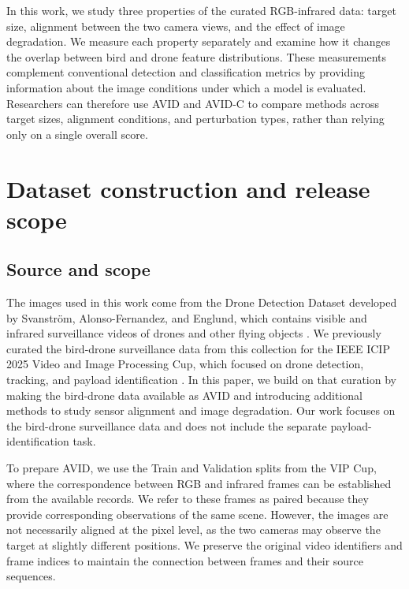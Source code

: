 \documentclass[10pt]{article}
\newcommand{\dataset}{\textsc{AVID}}
\newcommand{\corrupt}{\textsc{AVID-C}}
\begin{document}
In this work, we study three properties of the curated RGB-infrared data: target size, alignment between the two camera views, and the effect of image degradation. We measure each property separately and examine how it changes the overlap between bird and drone feature distributions. These measurements complement conventional detection and classification metrics by providing information about the image conditions under which a model is evaluated. Researchers can therefore use \dataset{} and \corrupt{} to compare methods across target sizes, alignment conditions, and perturbation types, rather than relying only on a single overall score.

\section{Dataset construction and release scope}
\label{sec:dataset}

\subsection{Source and scope}

The images used in this work come from the Drone Detection Dataset developed by Svanstr\"om, Alonso-Fernandez, and Englund, which contains visible and infrared surveillance videos of drones and other flying objects \citep{svanstrom2021multisensor,svanstrom2020repository}. We previously curated the bird-drone surveillance data from this collection for the IEEE ICIP 2025 Video and Image Processing Cup, which focused on drone detection, tracking, and payload identification \citep{ieeevipcup2025}. In this paper, we build on that curation by making the bird-drone data available as \dataset{} and introducing additional methods to study sensor alignment and image degradation. Our work focuses on the bird-drone surveillance data and does not include the separate payload-identification task.

To prepare \dataset{}, we use the Train and Validation splits from the VIP Cup, where the correspondence between RGB and infrared frames can be established from the available records. We refer to these frames as paired because they provide corresponding observations of the same scene. However, the images are not necessarily aligned at the pixel level, as the two cameras may observe the target at slightly different positions. We preserve the original video identifiers and frame indices to maintain the connection between frames and their source sequences.
\end{document}
